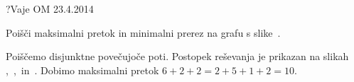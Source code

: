 \begin{naloga}{?}{Vaje OM 23.4.2014}
\begin{vprasanje}
Poišči maksimalni pretok in minimalni prerez na grafu s slike~\fig.

\begin{slika}
\pgfslika
{}
\end{slika}
\end{vprasanje}

\begin{odgovor}
Poiščemo disjunktne povečujoče poti.
Postopek reševanja je prikazan na slikah~%
\fig[pretok1a],~\fig[pretok1b],~\fig[pretok1c] in~\fig[pretok1d].
Dobimo maksimalni pretok $6+2+2 = 2+5+1+2 = 10$.

\begin{slika}
\pgfslika[pretok1a]
\end{slika}
\begin{slika}
\pgfslika[pretok1b]
\end{slika}
\begin{slika}
\pgfslika[pretok1c]
\end{slika}
\begin{slika}
\pgfslika[pretok1d]
\end{slika}
\end{odgovor}
\end{naloga}
